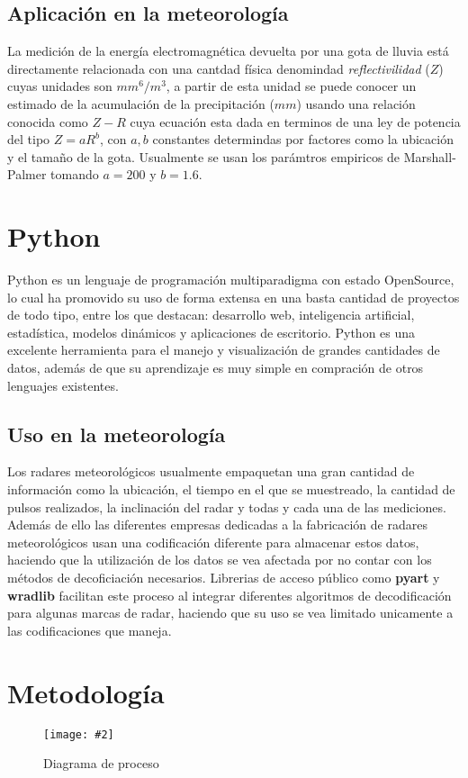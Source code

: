 \documentclass[letterpaper,12pt,oneside]{book}
\newcommand{\figura}[4]
{
  \begin{figure}[H]
    \centering
    \texttt{[image: \#2]}
    \caption{#3}
    \label{#4}
  \end{figure}
}
\begin{document}
    \section{Aplicación en la meteorología}
        La medición de la energía electromagnética devuelta por una gota de lluvia está directamente relacionada con una cantdad física denomindad \textit{reflectivilidad} ($Z$) cuyas unidades son $mm^6/m^3$, a partir de esta unidad se puede conocer un estimado de la acumulación de la precipitación ($mm$) usando una relación conocida como $Z-R$ cuya ecuación esta dada en terminos de una ley de potencia del tipo $Z= aR^b$, con $a,b$ constantes determindas por factores como la ubicación y el tamaño de la gota. Usualmente se usan los parámtros empiricos de Marshall-Palmer tomando $a=200$ y $b=1.6$.

\chapter{Python}
    Python es un lenguaje de programación multiparadigma con estado OpenSource, lo cual ha promovido su uso de forma extensa en una basta cantidad de proyectos de todo tipo, entre los que destacan: desarrollo web, inteligencia artificial, estadística, modelos dinámicos  y aplicaciones de escritorio.
    Python es una excelente herramienta para el manejo y visualización de grandes cantidades de datos, además de que su aprendizaje es muy simple en compración de otros lenguajes existentes. 
    \section{Uso en la meteorología}
        Los radares meteorológicos usualmente empaquetan una gran cantidad de información como la ubicación, el tiempo en el que se muestreado, la cantidad de pulsos realizados, la inclinación del radar y todas y cada una de las mediciones. 
        Además de ello las diferentes empresas dedicadas a la fabricación de radares meteorológicos usan una codificación diferente para almacenar estos datos, haciendo que la utilización de los datos se vea afectada por no contar con los métodos de decoficiación necesarios. 
        Librerias de acceso público como \textbf{pyart} y \textbf{wradlib} facilitan este proceso al integrar diferentes algoritmos de decodificación para algunas marcas de radar, haciendo que su uso se vea limitado unicamente a las codificaciones que maneja.

\chapter{Metodología}
    \figura{0.5}{/home/aceron/Documentos/GitHub/Tesis/docTesis/metodo.png}{Diagrama de proceso}{fig:fig1}
    
\end{document}
